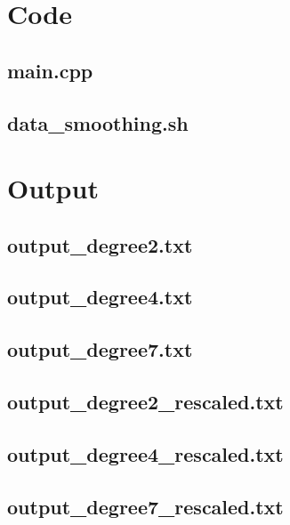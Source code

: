 \documentclass[11pt, a4paper, titlepage, openright]{article}
\begin{document}
\onecolumn
\appendix
\appendixpage
\addappheadtotoc

\section{Code}
	\subsection{main.cpp}
		
	\bigskip
	\subsection{data\_smoothing.sh}
		

\newpage
\section{Output}
\label{sec:output}
	\subsection{output\_degree2.txt}
	\label{sec:degree2}
		 
	\subsection{output\_degree4.txt}
		 
	\subsection{output\_degree7.txt}
		 
	\subsection{output\_degree2\_rescaled.txt}
	\label{sec:degree2_r}
		 
	\subsection{output\_degree4\_rescaled.txt}
		 
	\subsection{output\_degree7\_rescaled.txt}
	\label{sec:degree7_r}
		 
		
\end{document}
